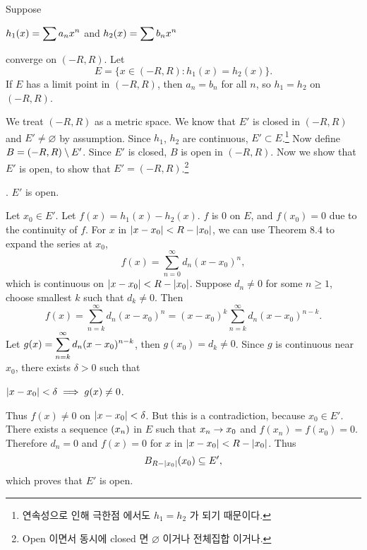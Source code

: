  Suppose
\begin{center}
    \(h_1(x) = \displaystyle \sum a_n x^n\) and \(\displaystyle h_2(x) = \sum b_n x^n\)
\end{center}
converge on \((-R, R)\). Let
\[
    E = \{x \in (-R, R) : h_1(x) = h_2(x)\}.
\]
If \(E\) has a limit point in \((-R, R)\), then \(a_n = b_n\) for all \(n\), so \(h_1 = h_2\) on \((-R, R)\).

\pf We treat \((-R, R)\) as a metric space. We know that \(E'\) is closed in \((-R, R)\) and \(E' \neq \varnothing\) by assumption. Since \(h_1\), \(h_2\) are continuous, \(E' \subset E\).\footnote{연속성으로 인해 극한점 에서도 \(h_1 = h_2\) 가 되기 때문이다.} Now define \(B = (-R, R) \setminus E'\). Since \(E'\) is closed, \(B\) is open in \((-R, R)\). Now we show that \(E'\) is open, to show that \(E' = (-R, R)\).\footnote{Open 이면서 동시에 closed 면 \(\varnothing\) 이거나 전체집합 이거나.}

\quad \claim. \(E'\) is open.

\quad \pf Let \(x_0 \in E'\). Let \(f(x) = h_1(x) - h_2(x)\). \(f\) is 0 on \(E\), and \(f(x_0) = 0\) due to the continuity of \(f\). For \(x\) in \(\left| x - x_0 \right| < R - \left| x_0 \right|\), we can use Theorem 8.4 to expand the series at \(x_0\),
\[
    f(x) = \sum_{n=0}^\infty d_n(x-x_0)^n,
\]
which is continuous on \(\left| x - x_0 \right| < R - \left| x_0 \right|\). Suppose \(d_n \neq 0\) for some \(n \geq 1\), choose smallest \(k\) such that \(d_k \neq 0\). Then
\[
    f(x) = \sum_{n=k}^\infty d_n(x-x_0)^n = (x-x_0)^k \sum_{n=k}^\infty d_n (x-x_0)^{n-k}.
\]
Let \(g(x) = \displaystyle\sum_{n=k}^\infty d_n(x-x_0)^{n-k}\), then \(g(x_0) = d_k \neq 0\). Since \(g\) is continuous near \(x_0\), there exists \(\delta > 0\) such that
\begin{center}
    \(\left| x - x_0 \right| < \delta \implies g(x) \neq 0\).
\end{center}
Thus \(f(x) \neq 0\) on \(\left| x - x_0 \right| < \delta\). But this is a contradiction, because \(x_0 \in E'\). There exists a sequence \(\left( x_n \right)\) in \(E\) such that \(x_n \rightarrow x_0\) and \(f(x_n) = f(x_0) = 0\). Therefore \(d_n = 0\) and \(f(x) = 0\) for \(x\) in \(\left| x-x_0 \right| < R - \left| x_0 \right|\). Thus
\[
    B_{R - \left| x_0 \right|}(x_0) \subseteq E',
\]
which proves that \(E'\) is open.

\pagebreak
